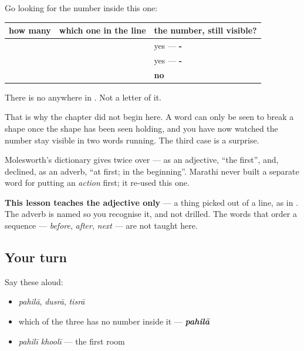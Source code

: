 \begin{grammarlens}[title={Grammar Lens: why \emph{first} arrives third}]
Go looking for the number inside this one:

\noindent
\begin{tabularx}{\linewidth}{@{}>{\raggedright\arraybackslash}X>{\raggedright\arraybackslash}X>{\raggedright\arraybackslash}X@{}}
\toprule
\textbf{how many} & \textbf{which one in the line} & \textbf{the number, still visible?} \\
\midrule
\textbf{\mr{दोन}} & \textbf{\mr{दुसरा}} & yes — \textbf{\mr{दु}-} \\
\textbf{\mr{तीन}} & \textbf{\mr{तिसरा}} & yes — \textbf{\mr{ति}-} \\
\textbf{\mr{एक}} & \textbf{\mr{पहिला}} & \textbf{no} \\
\bottomrule
\end{tabularx}

There is no \textbf{} anywhere in \textbf{}. Not a letter of it.

That is why the chapter did not begin here. A word can only be seen to break a shape once the shape has been seen holding, and you have now watched the number stay visible in two words running. The third case is a surprise.
\end{grammarlens}

\begin{grammarlens}[title={Grammar Lens: what this book claims about \mr{पहिला}, and what it does not}]
Molesworth's dictionary gives \textbf{} twice over — as an adjective, \textquotedblleft{}the first\textquotedblright{}, and, declined, as an adverb, \textquotedblleft{}at first; in the beginning\textquotedblright{}. Marathi never built a separate word for putting an \emph{action} first; it re-used this one.

\textbf{This lesson teaches the adjective only} — a thing picked out of a line, as in \textbf{ }. The adverb is named so you recognise it, and not drilled. The words that order a sequence — \emph{before}, \emph{after}, \emph{next} — are not taught here.
\end{grammarlens}

\subsection*{Your turn}
Say these aloud:

\begin{itemize}
\raggedright
  \item \emph{pahilā}, \emph{dusrā}, \emph{tisrā}
  \item which of the three has no number inside it — \emph{\textbf{pahilā}}
  \item \emph{pahilī khoolī} — the first room
\end{itemize}

